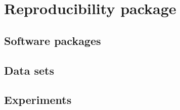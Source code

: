 \chapter{Reproducibility package}

\section{Software packages}

\section{Data sets}

\section{Experiments}
